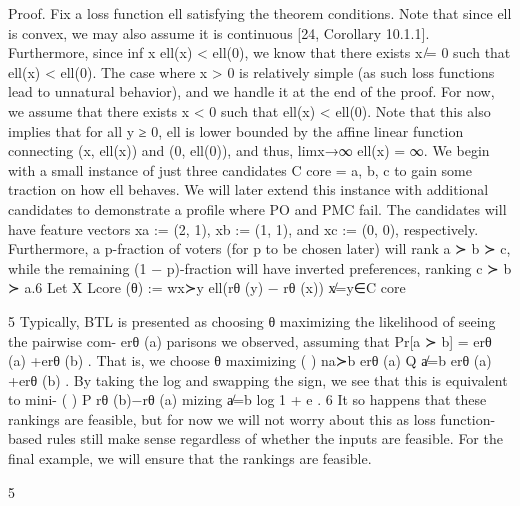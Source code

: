 \documentclass[10pt]{article}
\begin{document}
\begin{ReviewVerbatim}

Proof. Fix a loss function ell satisfying the theorem conditions. Note that since ell is convex, we may
also assume it is continuous [24, Corollary 10.1.1]. Furthermore, since inf x ell(x) < ell(0), we know
that there exists x ̸= 0 such that ell(x) < ell(0). The case where x > 0 is relatively simple (as
such loss functions lead to unnatural behavior), and we handle it at the end of the proof. For now,
we assume that there exists x < 0 such that ell(x) < ell(0). Note that this also implies that for all
y ≥ 0, ell is lower bounded by the affine linear function connecting (x, ell(x)) and (0, ell(0)), and thus,
limx→∞ ell(x) = ∞.
We begin with a small instance of just three candidates C core = {a, b, c} to gain some traction on
how ell behaves. We will later extend this instance with additional candidates to demonstrate a profile
where PO and PMC fail. The candidates will have feature vectors xa := (2, 1), xb := (1, 1), and
xc := (0, 0), respectively. Furthermore, a p-fraction of voters (for p to be chosen later) will rank
a ≻ b ≻ c, while the remaining (1 − p)-fraction will have inverted preferences, ranking c ≻ b ≻ a.6
Let                                              X
                              Lcore (θ) :=                  wx≻y ell(rθ (y) − rθ (x))
                                              x̸=y∈C core

      5
     Typically, BTL is presented as choosing θ maximizing the likelihood of seeing the pairwise com-
                                                                erθ (a)
parisons we observed, assuming that Pr[a ≻ b] = erθ (a)           +erθ (b)
                                                                           . That is, we choose θ maximizing
       (                ) na≻b
            erθ (a)
Q
  a̸=b erθ (a) +erθ (b)         . By taking the log and swapping the sign, we see that this is equivalent to mini-
                    (                     )
        P                   rθ (b)−rθ (a)
mizing a̸=b log 1 + e                      .
    6
      It so happens that these rankings are feasible, but for now we will not worry about this as loss function-
based rules still make sense regardless of whether the inputs are feasible. For the final example, we will ensure
that the rankings are feasible.


                                                        5


\end{ReviewVerbatim}
\end{document}
